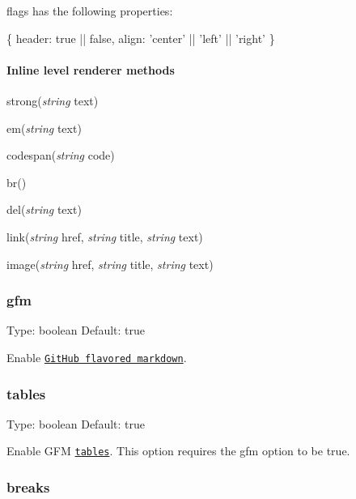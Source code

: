 {\ttfamily flags} has the following properties\+:


\begin{DoxyCode}
\{
    header: \textcolor{keyword}{true} || \textcolor{keyword}{false},
    align: \textcolor{stringliteral}{'center'} || \textcolor{stringliteral}{'left'} || \textcolor{stringliteral}{'right'}
\}
\end{DoxyCode}


\paragraph*{Inline level renderer methods}


\begin{DoxyItemize}
\item strong({\itshape string} text)
\item em({\itshape string} text)
\item codespan({\itshape string} code)
\item br()
\item del({\itshape string} text)
\item link({\itshape string} href, {\itshape string} title, {\itshape string} text)
\item image({\itshape string} href, {\itshape string} title, {\itshape string} text)
\end{DoxyItemize}

\subsubsection*{gfm}

Type\+: {\ttfamily boolean} Default\+: {\ttfamily true}

Enable \href{https://help.github.com/articles/github-flavored-markdown}{\tt Git\+Hub flavored markdown}.

\subsubsection*{tables}

Type\+: {\ttfamily boolean} Default\+: {\ttfamily true}

Enable G\+F\+M \href{https://github.com/adam-p/markdown-here/wiki/Markdown-Cheatsheet#wiki-tables}{\tt tables}. This option requires the {\ttfamily gfm} option to be true.

\subsubsection*{breaks}


